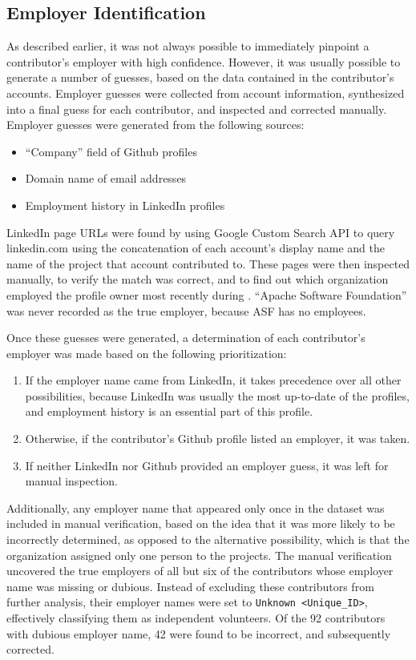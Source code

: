 \subsection{Employer Identification}\label{employersec}
As described earlier, it was not always possible to immediately pinpoint a contributor's employer with high confidence. However, it was usually possible to generate a number of guesses, 
based on the data contained in the contributor's accounts. Employer guesses were collected from account information, synthesized into a final guess for each contributor, and inspected and corrected manually.
Employer guesses were generated from the following sources:
\begin{itemize}
	\item ``Company'' field of Github profiles
	\item Domain name of email addresses
	\item Employment history in LinkedIn profiles
\end{itemize}
LinkedIn page URLs were found by using Google Custom Search API to query linkedin.com using the concatenation of each account's display name and the name of the project that account contributed to. These pages were then inspected manually, to verify the match was correct, and to find out which organization employed the profile owner most recently during \timeperiod{}. ``Apache Software Foundation'' was never recorded as the true employer, because ASF has no employees\cite{asf}.

Once these guesses were generated, a determination of each contributor's employer was made based on the following prioritization:
\begin{enumerate}
	\item If the employer name came from LinkedIn, it takes precedence over all other possibilities, because LinkedIn was usually the most up-to-date of the profiles, and employment history is an essential part of this profile.
	\item Otherwise, if the contributor's Github profile listed an employer, it was taken.
	\item If neither LinkedIn nor Github provided an employer guess, it was left for manual inspection.
\end{enumerate}
Additionally, any employer name that appeared only once in the dataset was included in manual verification, based on the idea that it was more likely to be incorrectly determined, as opposed to the alternative possibility, which is that the organization assigned only one person to the projects.
The manual verification uncovered the true employers of all but six of the contributors whose employer name was missing or dubious. Instead of excluding these contributors from further analysis, their employer names were set to \verb|Unknown <Unique_ID>|, effectively classifying them as independent volunteers. Of the 92 contributors with dubious employer name, 42 were found to be incorrect, and subsequently corrected.

